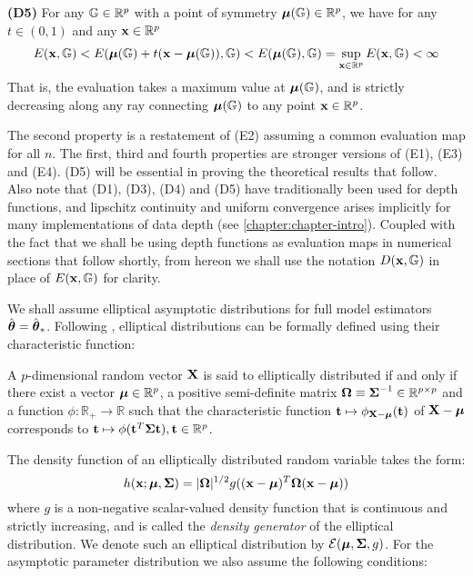 \noindent\textbf{(D5)}
For any  ${\mathbb{G}} \in {\mathbb{R}}^p$ with a point of symmetry ${\boldsymbol{\mu}} ({\mathbb{G}}) \in {\mathbb{R}}^{p}$, we have for any $ t \in (0, 1)$ and any ${\bf{x}} \in  {\mathbb{R}}^{p}$ 
\begin{align}
E ( {\bf{x}}, {\mathbb{G}}) < E ({\boldsymbol{\mu}} ({\mathbb{G}})  + t ({\bf{x}} - {\boldsymbol{\mu}} ({\mathbb{G}})), {\mathbb{G}})
< 
E ({\boldsymbol{\mu}} ({\mathbb{G}}), {\mathbb{G}})
= \sup_{{\bf{x}} \in  {\mathbb{R}}^{ p}} E ( {\bf{x}}, {\mathbb{G}}) < \infty
\end{align}
%
That is, the evaluation takes a maximum value at ${\boldsymbol{\mu}} ({\mathbb{G}})$, and is strictly decreasing along any ray connecting ${\boldsymbol{\mu}} ({\mathbb{G}})$ to any point ${\bf{x}} \in  {\mathbb{R}}^{ p}$.

\vspace{1em}
The second property is a restatement of (E2) assuming a common evaluation map for all $n$. The first, third and fourth properties are stronger versions of (E1), (E3) and (E4). (D5) will be essential in proving the theoretical results that follow. Also note that (D1), (D3), (D4) and (D5) have traditionally been used for depth functions, and lipschitz continuity and uniform convergence arises implicitly for many implementations of data depth (see \ref{chapter:chapter-intro}). Coupled with the fact that we shall be using depth functions as evaluation maps in numerical sections that follow shortly, from hereon we shall use the notation $D({\bf{x}}, {\mathbb{G}})$ in place of $E({\bf{x}}, {\mathbb{G}})$ for clarity.

We shall assume elliptical asymptotic distributions for full model estimators $\hat {{\boldsymbol{\theta}}} = \hat {{\boldsymbol{\theta}}}_*$. Following \cite{FangEtal90}, elliptical distributions can be formally defined using their characteristic function:
%
\begin{Definition}
A $p$-dimensional random vector ${\mathbf{X}}$ is said to elliptically distributed if and only if there exist a vector ${\boldsymbol{\mu}} \in \mathbb R^p$, a positive semi-definite matrix ${\boldsymbol{\Omega}} \equiv {\boldsymbol{\Sigma}}^{-1} \in \mathbb R^{p \times p}$ and a function $\phi: \mathbb R_+ \rightarrow \mathbb R$ such that the characteristic function ${\bf{t}} \mapsto \phi_{{\mathbf{X}} - {\boldsymbol{\mu}}} ({\bf{t}})$ of ${\mathbf{X}} - {\boldsymbol{\mu}}$ corresponds to ${\bf{t}} \mapsto \phi ({\bf{t}}^T {\boldsymbol{\Sigma}} {\bf{t}}), {\bf{t}} \in \mathbb R^p$.
\end{Definition}
%
The density function of an elliptically distributed random variable takes the form:
%
$$ h({\bf{x}}; {\boldsymbol{\mu}}, {\boldsymbol{\Sigma}}) = |{\boldsymbol{\Omega}}|^{1/2} g (({\bf{x}} - {\boldsymbol{\mu}})^T {\boldsymbol{\Omega}} ({\bf{x}} - {\boldsymbol{\mu}})) $$
%
where $g$ is a non-negative scalar-valued density function that is continuous and strictly increasing, and is called the \textit{density generator} of the elliptical distribution. We denote such an elliptical distribution by ${\cal{E}} ({\boldsymbol{\mu}}, {\boldsymbol{\Sigma}}, g)$. For the asymptotic parameter distribution we also assume the following conditions:

